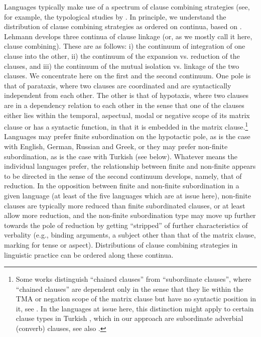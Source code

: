 \documentclass[output=paper,colorlinks,citecolor=brown]{langscibook}
\begin{document}
Languages typically make use of a spectrum of clause combining strategies (see, for example, the typological studies by \textcite{haspelmath2004}. In principle, we understand the distribution of clause combining strategies as ordered on continua, based on \textcite{lehmann1988towards}. Lehmann develops three continua of clause linkage (or, as we mostly call it here, clause combining). These are as follows: i) the continuum of integration of one clause into the other, ii) the continuum of the expansion vs. reduction of the clauses, and iii) the continuum of the mutual isolation vs. linkage of the two clauses. We concentrate here on the first and the second continuum. One pole is that of parataxis, where two clauses are coordinated and are syntactically independent from each other. The other is that of hypotaxis, where two clauses are in a dependency relation to each other in the sense that one of the clauses either lies within the temporal, aspectual, modal or negative scope of its matrix clause or  has a syntactic function, in that it is embedded in the matrix clause.\footnote{Some works distinguish “chained clauses” from “subordinate clauses”, where “chained clauses” are dependent only in the sense that they lie within the TMA or negation scope of the matrix clause but have no syntactic position in it, see \textcite{sarvasy2020acquisition}. In the languages at issue here, this distinction might apply to certain clause types in Turkish \parencite{ogel2020clause}, which in our approach are subordinate adverbial (converb) clauses, see also \textcite{iefremenko2021converbs}.} Languages may prefer finite subordination on the hypotactic pole, as is the case with English, German, Russian and Greek, or they may prefer non-finite subordination, as is the case with Turkish (see below). Whatever means the individual languages prefer, the relationship between finite and non-finite appears to be directed in the sense of the second continuum \textcite{lehmann1988towards} develops, namely, that of reduction. In the opposition between finite and non-finite subordination in a given language (at least of the five languages which are at issue here), non-finite clauses are typically more reduced than finite subordinated clauses, or at least allow more reduction, and the non-finite subordination type may move up further towards the pole of reduction by getting “stripped” of further characteristics of verbality (e.g., binding arguments, a subject other than that of the matrix clause, marking for tense or aspect). Distributions of clause combining strategies in linguistic practice can be ordered along these continua. 
\end{document}
